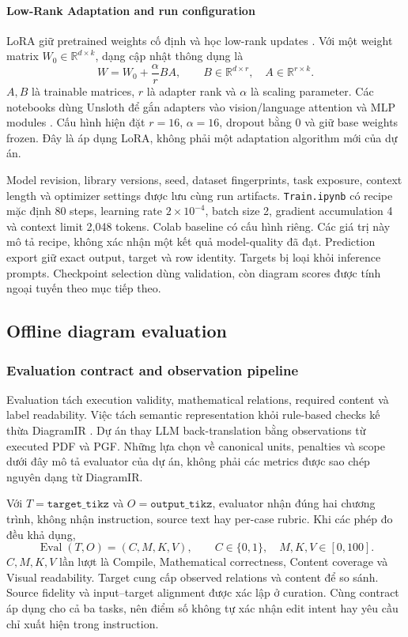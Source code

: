 \documentclass[a4paper,12pt]{article}
\begin{document}
\paragraph{Low-Rank Adaptation and run configuration}
LoRA giữ pretrained weights cố định và học low-rank updates \cite{lora}. Với một weight matrix $W_0\in\mathbb R^{d\times k}$, dạng cập nhật thông dụng là
\begin{equation}
W=W_0+\frac{\alpha}{r}BA,\qquad
B\in\mathbb R^{d\times r},\quad A\in\mathbb R^{r\times k}.
\end{equation}
$A,B$ là trainable matrices, $r$ là adapter rank và $\alpha$ là scaling parameter. Các notebooks dùng Unsloth để gắn adapters vào vision/language attention và MLP modules \cite{unsloth35}. Cấu hình hiện đặt $r=16$, $\alpha=16$, dropout bằng 0 và giữ base weights frozen. Đây là áp dụng LoRA, không phải một adaptation algorithm mới của dự án.

Model revision, library versions, seed, dataset fingerprints, task exposure, context length và optimizer settings được lưu cùng run artifacts. \texttt{Train.ipynb} có recipe mặc định 80 steps, learning rate $2\times10^{-4}$, batch size 2, gradient accumulation 4 và context limit 2,048 tokens. Colab baseline có cấu hình riêng. Các giá trị này mô tả recipe, không xác nhận một kết quả model-quality đã đạt. Prediction export giữ exact output, target và row identity. Targets bị loại khỏi inference prompts. Checkpoint selection dùng validation, còn diagram scores được tính ngoại tuyến theo mục tiếp theo.

\subsection{Offline diagram evaluation}
\label{sec:evaluation}
\subsubsection{Evaluation contract and observation pipeline}
Evaluation tách execution validity, mathematical relations, required content và label readability. Việc tách semantic representation khỏi rule-based checks kế thừa DiagramIR \cite{ref2}. Dự án thay LLM back-translation bằng observations từ executed PDF và PGF. Những lựa chọn về canonical units, penalties và scope dưới đây mô tả evaluator của dự án, không phải các metrics được sao chép nguyên dạng từ DiagramIR.

Với $T=\texttt{target\_tikz}$ và $O=\texttt{output\_tikz}$, evaluator nhận đúng hai chương trình, không nhận instruction, source text hay per-case rubric. Khi các phép đo đều khả dụng,
\begin{equation}
\operatorname{Eval}(T,O)=(C,M,K,V),\qquad
C\in\{0,1\},\quad M,K,V\in[0,100].
\end{equation}
$C,M,K,V$ lần lượt là Compile, Mathematical correctness, Content coverage và Visual readability. Target cung cấp observed relations và content để so sánh. Source fidelity và input--target alignment được xác lập ở curation. Cùng contract áp dụng cho cả ba tasks, nên điểm số không tự xác nhận edit intent hay yêu cầu chỉ xuất hiện trong instruction.
\end{document}

